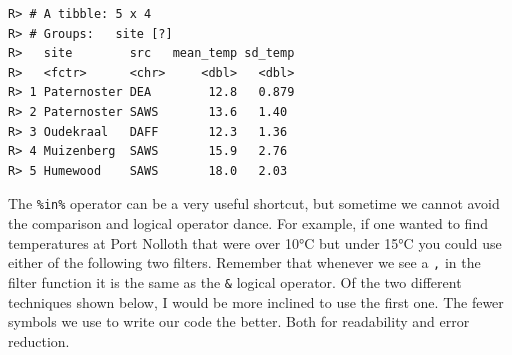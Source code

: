 \documentclass[]{book}
\newenvironment{Shaded}{\begin{snugshade}}{\end{snugshade}}
\newcommand{\KeywordTok}[1]{\textcolor[rgb]{0.13,0.29,0.53}{\textbf{#1}}}
\newcommand{\DataTypeTok}[1]{\textcolor[rgb]{0.13,0.29,0.53}{#1}}
\newcommand{\DecValTok}[1]{\textcolor[rgb]{0.00,0.00,0.81}{#1}}
\newcommand{\StringTok}[1]{\textcolor[rgb]{0.31,0.60,0.02}{#1}}
\newcommand{\CommentTok}[1]{\textcolor[rgb]{0.56,0.35,0.01}{\textit{#1}}}
\newcommand{\OtherTok}[1]{\textcolor[rgb]{0.56,0.35,0.01}{#1}}
\newcommand{\OperatorTok}[1]{\textcolor[rgb]{0.81,0.36,0.00}{\textbf{#1}}}
\newcommand{\NormalTok}[1]{#1}
\theoremstyle{definition}
\theoremstyle{definition}
\theoremstyle{definition}
\theoremstyle{remark}
\begin{document}
\begin{Shaded}
\end{Shaded}

\begin{verbatim}
R> # A tibble: 5 x 4
R> # Groups:   site [?]
R>   site        src   mean_temp sd_temp
R>   <fctr>      <chr>     <dbl>   <dbl>
R> 1 Paternoster DEA        12.8   0.879
R> 2 Paternoster SAWS       13.6   1.40 
R> 3 Oudekraal   DAFF       12.3   1.36 
R> 4 Muizenberg  SAWS       15.9   2.76 
R> 5 Humewood    SAWS       18.0   2.03
\end{verbatim}

The \texttt{\%in\%} operator can be a very useful shortcut, but sometime
we cannot avoid the comparison and logical operator dance. For example,
if one wanted to find temperatures at Port Nolloth that were over 10°C
but under 15°C you could use either of the following two filters.
Remember that whenever we see a \texttt{,} in the filter function it is
the same as the \texttt{\&} logical operator. Of the two different
techniques shown below, I would be more inclined to use the first one.
The fewer symbols we use to write our code the better. Both for
readability and error reduction.

\begin{Shaded}
\end{Shaded}
\end{document}

